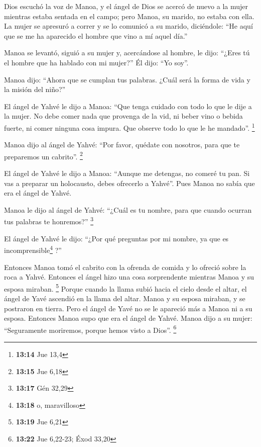 \begin{paracol}{2}
 Dios escuchó la voz de Manoa, y el ángel de Dios se
acercó de nuevo a la mujer mientras estaba sentada en el campo; pero
Manoa, su marido, no estaba con ella.  La mujer se
apresuró a correr y se lo comunicó a su marido, diciéndole: ``He aquí
que se me ha aparecido el hombre que vino a mí aquel día.''

 Manoa se levantó, siguió a su mujer y, acercándose al
hombre, le dijo: ``¿Eres tú el hombre que ha hablado con mi mujer?'' Él
dijo: ``Yo soy''.

 Manoa dijo: ``Ahora que se cumplan tus palabras. ¿Cuál
será la forma de vida y la misión del niño?''

 El ángel de Yahvé le dijo a Manoa: ``Que tenga cuidado
con todo lo que le dije a la mujer.  No debe comer nada
que provenga de la vid, ni beber vino o bebida fuerte, ni comer ninguna
cosa impura. Que observe todo lo que le he mandado''. \footnote{\textbf{13:14}
  Jue 13,4}

 Manoa dijo al ángel de Yahvé: ``Por favor, quédate con
nosotros, para que te preparemos un cabrito''. \footnote{\textbf{13:15}
  Jue 6,18}

 El ángel de Yahvé le dijo a Manoa: ``Aunque me detengas,
no comeré tu pan. Si vas a preparar un holocausto, debes ofrecerlo a
Yahvé''. Pues Manoa no sabía que era el ángel de Yahvé.

 Manoa le dijo al ángel de Yahvé: ``¿Cuál es tu nombre,
para que cuando ocurran tus palabras te honremos?'' \footnote{\textbf{13:17}
  Gén 32,29}

 El ángel de Yahvé le dijo: ``¿Por qué preguntas por mi
nombre, ya que es incomprensible\footnote{\textbf{13:18} o, maravilloso}
?''

 Entonces Manoa tomó el cabrito con la ofrenda de comida
y lo ofreció sobre la roca a Yahvé. Entonces el ángel hizo una cosa
sorprendente mientras Manoa y su esposa miraban. \footnote{\textbf{13:19}
  Jue 6,21}  Porque cuando la llama subió hacia el cielo
desde el altar, el ángel de Yavé ascendió en la llama del altar. Manoa y
su esposa miraban, y se postraron en tierra.  Pero el
ángel de Yavé no se le apareció más a Manoa ni a su esposa. Entonces
Manoa supo que era el ángel de Yahvé.  Manoa dijo a su
mujer: ``Seguramente moriremos, porque hemos visto a Dios''. \footnote{\textbf{13:22}
  Jue 6,22-23; Éxod 33,20}


\end{paracol}
